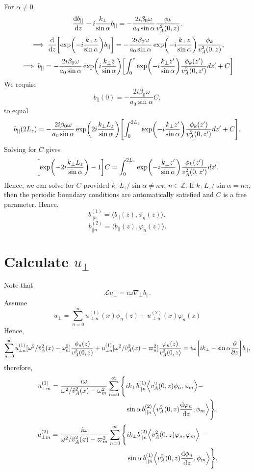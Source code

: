 \documentclass{article}
\begin{document}
For $\alpha \ne 0$
\[\dv{b_{||}}{z}-i\frac{k_\perp}{\sin\alpha}b_{||}=-\frac{2i\beta_0\omega}{a_0\sin\alpha}\frac{\phi_k}{v_A^2(0,z)}.\]
\[\implies \dv{}{z}\qty[\exp(-i\frac{k_\perp z}{\sin\alpha})b_{||}]=-\frac{2i\beta_0\omega}{a_0\sin\alpha}\exp(-i\frac{k_\perp z}{\sin\alpha})\frac{\phi_k}{v_A^2(0,z)},\]
\[\implies b_{||} = -\frac{2i\beta_0\omega}{a_0\sin\alpha}\exp(i\frac{k_\perp z}{\sin\alpha})\qty[\int_0^z\exp(-i\frac{k_\perp z'}{\sin\alpha})\frac{\phi_k(z')}{v_A^2(0,z')}dz'+C]\]
We require 
\[b_{||}(0) = -\frac{2i\beta_0\omega}{a_0\sin\alpha}C,\]
to equal
\[b_{||}(2L_z) = -\frac{2i\beta_0\omega}{a_0\sin\alpha}\exp(2i\frac{k_\perp L_z}{\sin\alpha})\qty[\int_0^{2L_z}\exp(-i\frac{k_\perp z'}{\sin\alpha})\frac{\phi_k(z')}{v_A^2(0,z')}dz'+C].\]
Solving for $C$ gives
\[\qty[\exp(-2i\frac{k_\perp L_z}{\sin\alpha})-1]C = \int_0^{2L_z}\exp(-i\frac{k_\perp z'}{\sin\alpha})\frac{\phi_k(z')}{v_A^2(0,z')}dz'.\]
Hence, we can solve for $C$ provided $k_\perp L_z / \sin\alpha \ne n\pi$, $n\in\mathds{Z}$. If $k_\perp L_z / \sin\alpha = 
n\pi$, then the periodic boundary conditions are automatically satisfied and $C$ is a free parameter. Hence,
\[b_{||n}^{(1)} = \Big\langle b_{||}(z), \phi_n(z) \Big\rangle,\]
\[b_{||n}^{(2)} = \Big\langle b_{||}(z), \varphi_n(z) \Big\rangle.\]

\section*{Calculate $u_\perp$}

Note that
\[\mathcal{L}u_\perp = i\omega \nabla_\perp b_{||}.\]
Assume
\[u_\perp = \sum_{n=0}^\infty u_{\perp n}^{(1)}(x)\phi_n(z) + u_{\perp n}^{(2)}(x)\varphi_n(z)\]
Hence,
\[\sum_{n=0}^\infty u_{\perp n}^{(1)}[\omega^2/\hat{v}_A^2(x) - \omega_n^2]\frac{\phi_n(z)}{v_A^2(0,z)}+u_{\perp n}^{(1)}[\omega^2/\hat{v}_A^2(x) - \varpi_n^2]\frac{\varphi_n(z)}{v_A^2(0,z)}=i\omega\qty[ik_\perp - \sin\alpha\pdv{}{z}]b_{||},\]
therefore,
\[\begin{aligned}
u_{\perp m}^{(1)} = \frac{i\omega}{\omega^2/\hat{v}_A^2(x)-\omega_m^2}\sum_{n=0}^\infty\Bigg\{&ik_\perp b_{|| n}^{(1)}\Big\langle v_A^2(0,z)\phi_n,\phi_m \Big\rangle - \\
&\sin\alpha\, b_{||n}^{(2)}\Big\langle v_A^2(0,z)\dv{\varphi_n}{z},\phi_m\Big\rangle \Bigg\},
\end{aligned}\]
\[\begin{aligned}
u_{\perp m}^{(2)} = \frac{i\omega}{\omega^2/\hat{v}_A^2(x)-\varpi_m^2}\sum_{n=0}^\infty\Bigg\{&ik_\perp b_{|| n}^{(2)}\Big\langle v_A^2(0,z)\varphi_n,\varphi_m \Big\rangle - \\
&\sin\alpha\, b_{||n}^{(1)}\Big\langle v_A^2(0,z)\dv{\phi_n}{z},\phi_m\Big\rangle \Bigg\}.
\end{aligned}\]
\end{document}
